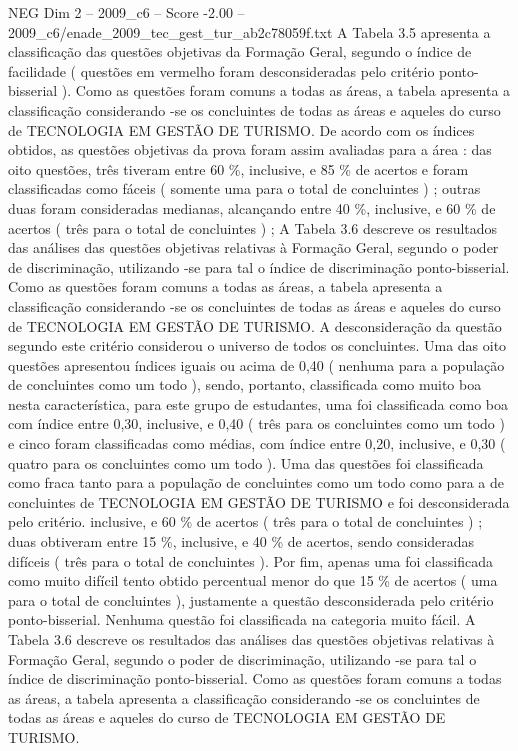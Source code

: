 \begin{textsample}{NEG Dim 2 – 2009\_c6 – Score -2.00 – 2009\_c6/enade\_2009\_tec\_gest\_tur\_ab2c78059f.txt}
A Tabela 3.5 apresenta a classificação das questões objetivas da Formação Geral, segundo o índice de facilidade ( questões em vermelho foram desconsideradas pelo critério ponto-bisserial ).
Como as questões foram comuns a todas as áreas, a tabela apresenta a classificação considerando -se os concluintes de todas as áreas e aqueles do curso de TECNOLOGIA EM GESTÃO DE TURISMO.
De acordo com os índices obtidos, as questões objetivas da prova foram assim avaliadas para a área : das oito questões, três tiveram entre 60 \%, inclusive, e 85 \% de acertos e foram classificadas como fáceis ( somente uma para o total de concluintes ) ; outras duas foram consideradas medianas, alcançando entre 40 \%, inclusive, e 60 \% de acertos ( três para o total de concluintes ) ; A Tabela 3.6 descreve os resultados das análises das questões objetivas relativas à Formação Geral, segundo o poder de discriminação, utilizando -se para tal o índice de discriminação ponto-bisserial.
Como as questões foram comuns a todas as áreas, a tabela apresenta a classificação considerando -se os concluintes de todas as áreas e aqueles do curso de TECNOLOGIA EM GESTÃO DE TURISMO.
A desconsideração da questão segundo este critério considerou o universo de todos os concluintes.
Uma das oito questões apresentou índices iguais ou acima de 0,40 ( nenhuma para a população de concluintes como um todo ), sendo, portanto, classificada como muito boa nesta característica, para este grupo de estudantes, uma foi classificada como boa com índice entre 0,30, inclusive, e 0,40 ( três para os concluintes como um todo ) e cinco foram classificadas como médias, com índice entre 0,20, inclusive, e 0,30 ( quatro para os concluintes como um todo ).
Uma das questões foi classificada como fraca tanto para a população de concluintes como um todo como para a de concluintes de TECNOLOGIA EM GESTÃO DE TURISMO e foi desconsiderada pelo critério. inclusive, e 60 \% de acertos ( três para o total de concluintes ) ; duas obtiveram entre 15 \%, inclusive, e 40 \% de acertos, sendo consideradas difíceis ( três para o total de concluintes ).
Por fim, apenas uma foi classificada como muito difícil tento obtido percentual menor do que 15 \% de acertos ( uma para o total de concluintes ), justamente a questão desconsiderada pelo critério ponto-bisserial.
Nenhuma questão foi classificada na categoria muito fácil.
A Tabela 3.6 descreve os resultados das análises das questões objetivas relativas à Formação Geral, segundo o poder de discriminação, utilizando -se para tal o índice de discriminação ponto-bisserial.
Como as questões foram comuns a todas as áreas, a tabela apresenta a classificação considerando -se os concluintes de todas as áreas e aqueles do curso de TECNOLOGIA EM GESTÃO DE TURISMO.

\end{textsample}
